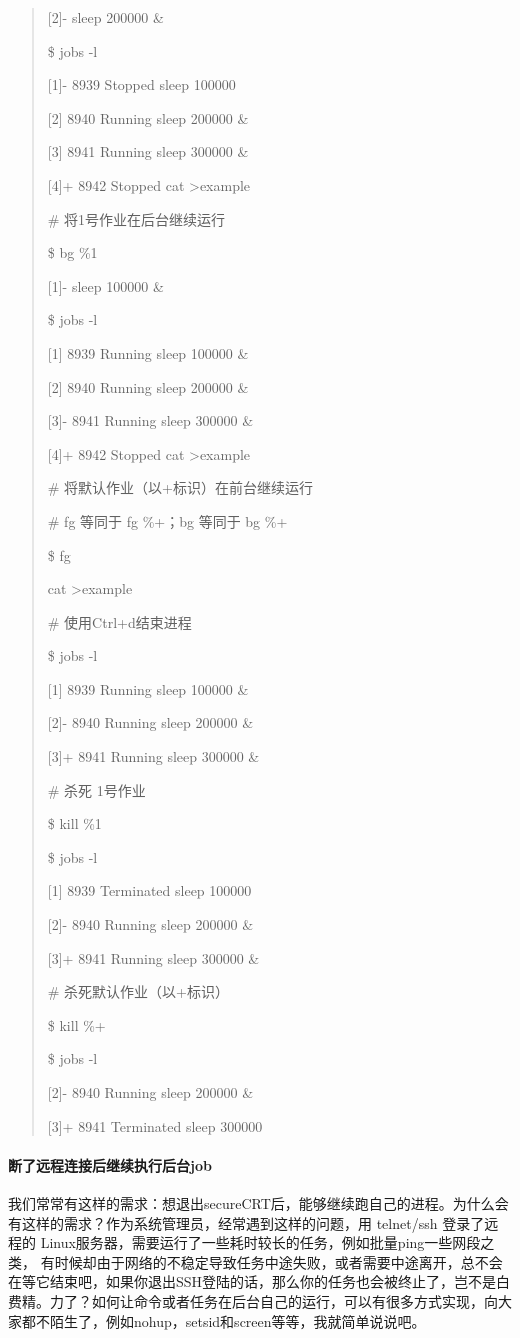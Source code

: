 \documentclass[letterpaper,10pt]{sphinxmanual}
\begin{document}
\begin{quote}
{[}2{]}- sleep 200000 \&

\$ jobs -l

{[}1{]}- 8939 Stopped sleep 100000

{[}2{]} 8940 Running sleep 200000 \&

{[}3{]} 8941 Running sleep 300000 \&

{[}4{]}+ 8942 Stopped cat \textgreater{}example

\# 将1号作业在后台继续运行

\$ bg \%1

{[}1{]}- sleep 100000 \&

\$ jobs -l

{[}1{]} 8939 Running sleep 100000 \&

{[}2{]} 8940 Running sleep 200000 \&

{[}3{]}- 8941 Running sleep 300000 \&

{[}4{]}+ 8942 Stopped cat \textgreater{}example

\# 将默认作业（以+标识）在前台继续运行

\# fg 等同于 fg \%+；bg 等同于 bg \%+

\$ fg

cat \textgreater{}example

\# 使用Ctrl+d结束进程

\$ jobs -l

{[}1{]} 8939 Running sleep 100000 \&

{[}2{]}- 8940 Running sleep 200000 \&

{[}3{]}+ 8941 Running sleep 300000 \&

\# 杀死 1号作业

\$ kill \%1

\$ jobs -l

{[}1{]} 8939 Terminated sleep 100000

{[}2{]}- 8940 Running sleep 200000 \&

{[}3{]}+ 8941 Running sleep 300000 \&

\# 杀死默认作业（以+标识）

\$ kill \%+

\$ jobs -l

{[}2{]}- 8940 Running sleep 200000 \&

{[}3{]}+ 8941 Terminated sleep 300000
\end{quote}


\paragraph{断了远程连接后继续执行后台job}
\label{Linux_pro_mana/process:job}
我们常常有这样的需求：想退出secureCRT后，能够继续跑自己的进程。为什么会有这样的需求？作为系统管理员，经常遇到这样的问题，用 telnet/ssh 登录了远程的 Linux服务器，需要运行了一些耗时较长的任务，例如批量ping一些网段之类，
有时候却由于网络的不稳定导致任务中途失败，或者需要中途离开，总不会在等它结束吧，如果你退出SSH登陆的话，那么你的任务也会被终止了，岂不是白费精。力了？如何让命令或者任务在后台自己的运行，可以有很多方式实现，向大家都不陌生了，例如nohup，setsid和screen等等，我就简单说说吧。
\end{document}
